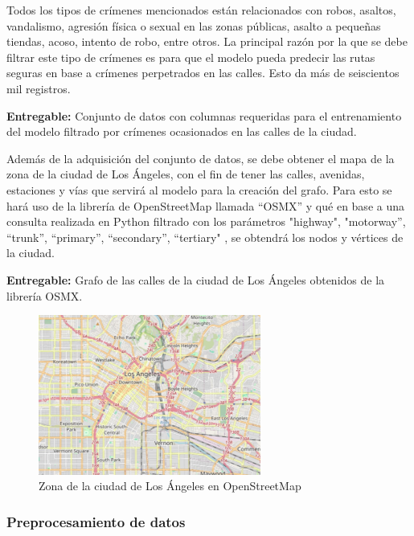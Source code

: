 Todos los tipos de crímenes mencionados están relacionados con robos, asaltos, vandalismo, agresión física o sexual en las zonas públicas, asalto a pequeñas tiendas, acoso, intento de robo, entre otros. La principal razón por la que se debe filtrar este tipo de crímenes es para que el modelo pueda predecir las rutas seguras en base a crímenes perpetrados en las calles. Esto da más de seiscientos mil registros.

\textbf{Entregable:} Conjunto de datos con columnas requeridas para el entrenamiento del modelo filtrado por crímenes ocasionados en las calles de la ciudad.

Además de la adquisición del conjunto de datos, se debe obtener el mapa de la zona de la ciudad de Los Ángeles, con el fin de tener las calles, avenidas, estaciones y vías que servirá al modelo para la creación del grafo. Para esto se hará uso de la librería de OpenStreetMap llamada “OSMX” y qué en base a una consulta realizada en Python filtrado con los parámetros "highway", "motorway”, “trunk”, “primary”, “secondary”, “tertiary" , se obtendrá los nodos y vértices de la ciudad.

\textbf{Entregable:} Grafo de las calles de la ciudad de Los Ángeles obtenidos de la librería OSMX.
\medskip

\begin{figure}[h]
	\begin{center}
		\includegraphics[width=0.65\textwidth]{3/figures/grafoa.jpg}
		\caption[Zona de la ciudad de Los Ángeles en OpenStreetMap]{Zona de la ciudad de Los Ángeles en OpenStreetMap}
		\label{1:fig}
	\end{center}
\end{figure}
\medskip

\subsubsection{Preprocesamiento de datos}

